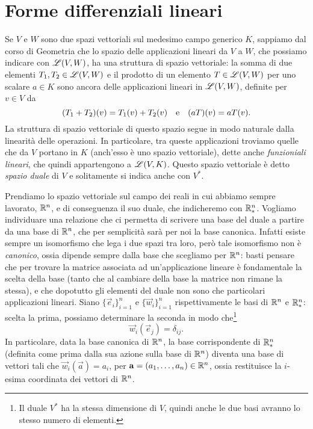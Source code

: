 \section{Forme differenziali lineari}
Se $V$ e $W$ sono due spazi vettoriali sul medesimo campo generico $K$, sappiamo dal corso di Geometria che lo spazio delle applicazioni lineari da $V$ a $W$, che possiamo indicare con $\mathscr L(V,W)$, ha una struttura di spazio vettoriale: la somma di due elementi $T_1,T_2\in\mathscr L(V,W)$ e il prodotto di un elemento $T\in\mathscr L(V,W)$ per uno scalare $a\in K$ sono ancora delle applicazioni lineari in $\mathscr L(V,W)$, definite per $v\in V$ da
\begin{equation*}
	(T_1+T_2)(v)=T_1(v)+T_2(v)\quad\text{e}\quad (aT)(v)=aT(v).
\end{equation*}
La struttura di spazio vettoriale di questo spazio segue in modo naturale dalla linearità delle operazioni.
In particolare, tra queste applicazioni troviamo quelle che da $V$ portano in $K$ (anch'esso è uno spazio vettoriale), dette anche \emph{funzioniali lineari}, che quindi appartengono a $\mathscr L(V,K)$.
Questo spazio vettoriale è detto \emph{spazio duale} di $V$ e solitamente si indica anche con $V^*$.

Prendiamo lo spazio vettoriale sul campo dei reali in cui abbiamo sempre lavorato, $\mathbb{R}^n$, e di conseguenza il suo duale, che indicheremo con $\mathbb{R}^n_*$.
Vogliamo individuare una relazione che ci permetta di scrivere una base del duale a partire da una base di $\mathbb{R}^n$, che per semplicità sarà per noi la base canonica.
Infatti esiste sempre un isomorfismo che lega i due spazi tra loro, però tale isomorfismo non è \emph{canonico}, ossia dipende sempre dalla base che scegliamo per $\mathbb{R}^n$: basti pensare che per trovare la matrice associata ad un'applicazione lineare è fondamentale la scelta della base (tanto che al cambiare della base la matrice non rimane la stessa), e che dopotutto gli elementi del duale non sono che particolari applicazioni lineari.
Siano $\{\vec e_i\}_{i=1}^n$ e $\{\vec w_i\}_{i=1}^n$ rispettivamente le basi di $\mathbb{R}^n$ e $\mathbb{R}^n_*$: scelta la prima, possiamo determinare la seconda in modo che\footnote{Il duale $V^*$ ha la stessa dimensione di $V$, quindi anche le due basi avranno lo stesso numero di elementi.}
\begin{equation}
	\vec w_i(\vec e_j)=\delta_{ij}.
	\label{eq:funzionale-base-canonica}
\end{equation}
In particolare, data la base canonica di $\mathbb{R}^n$, la base corrispondente di $\mathbb{R}^n_*$ (definita come prima dalla sua azione sulla base di $\mathbb{R}^n$) diventa una base di vettori tali che $\vec w_i(\vec a)=a_i$, per $\mathbf{a}=(a_1,\dots,a_n)\in\mathbb{R}^n$, ossia restituisce la $i$-esima coordinata dei vettori di $\mathbb{R}^n$.

